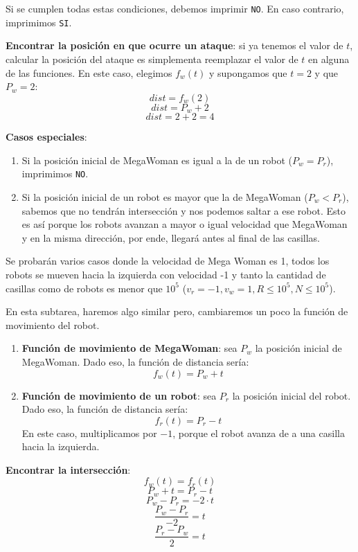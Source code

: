 \documentclass{oci}
\begin{document}
\begin{scoreDescription}
  Si se cumplen todas estas condiciones, debemos imprimir \texttt{NO}. 
  En caso contrario, imprimimos \texttt{SI}.

  \textbf{Encontrar la posici\'on  en que ocurre un ataque}: si ya tenemos el valor
  de $t$, calcular la posici\'on del ataque es simplementa reemplazar el valor de $t$
  en alguna de las funciones. En este caso, elegimos $f_w(t)$ y supongamos que $t = 2$
  y que $P_w = 2$:
  $$dist = f_w(2)$$
  $$dist = P_w + 2$$
  $$dist = 2 + 2 = 4$$

  \textbf{Casos especiales}:
  \begin{enumerate}
    \item Si la posici\'on inicial de MegaWoman es igual a la de un robot ($P_w = P_r$), imprimimos \texttt{NO}.
    \item Si la posici\'on inicial de un robot es mayor que la de MegaWoman ($P_w < P_r$), sabemos
    que no tendr\'an intersecci\'on y nos podemos saltar a ese robot. Esto es as\'i
    porque los robots avanzan a mayor o igual velocidad que MegaWoman y en la misma 
    direcci\'on, por ende, llegar\'a antes al final de las casillas.
  \end{enumerate}

  \noindent\makebox[\linewidth]{\rule{\paperwidth}{0.2pt}}

   Se probarán varios casos donde la velocidad de Mega Woman es 1,
  todos los robots se mueven hacia la izquierda con velocidad -1 y tanto la cantidad
  de casillas como de robots es menor que $10^5$ ($v_r=-1, v_w=1, R\leq 10^5,
  N\leq 10^5$).

  En esta subtarea, haremos algo similar pero, cambiaremos un poco la funci\'on
  de movimiento del robot.

  \begin{enumerate}
    \item \textbf{Funci\'on de movimiento de MegaWoman}: sea $P_w$ la posici\'on
    inicial de MegaWoman. Dado eso, la funci\'on
    de distancia ser\'ia:
    $$f_w(t) = P_w + t$$
    \item \textbf{Funci\'on de movimiento de un robot}: sea $P_r$ la posici\'on
    inicial del robot. Dado eso, la funci\'on
    de distancia ser\'ia:
    $$f_r(t) = P_r - t$$
    En este caso, multiplicamos por $-1$, porque el robot avanza de a una casilla 
    hacia la izquierda.
  \end{enumerate}

  \textbf{Encontrar la intersecci\'on}:
  $$ f_w(t) = f_r(t)$$
  $$ P_w + t = P_r - t $$
  $$ P_w - P_r =  -2 \cdot t $$
  $$ \frac{P_w - P_r}{-2} =  t $$
  $$ \frac{P_r - P_w}{2} =  t $$


\end{scoreDescription}
\end{document}

